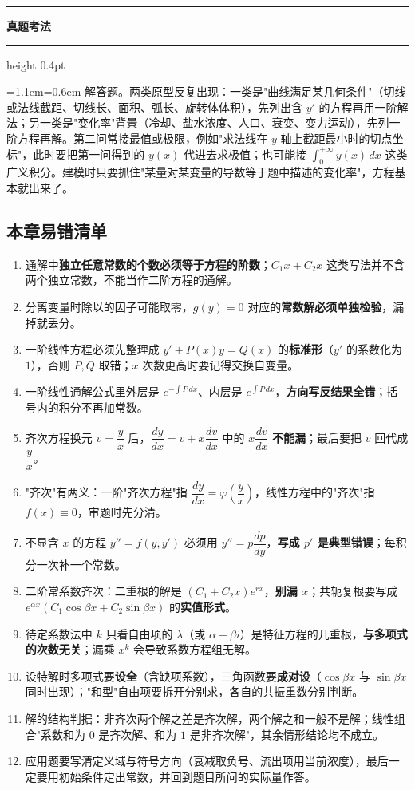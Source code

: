 \documentclass[11pt,openany,UTF8]{ctexbook}
\newcommand{\callouthead}[2]{%
  \par\addvspace{7pt}\noindent
  {\color{#1}\rule[-0.15em]{3pt}{1.05em}}\hspace{0.5em}%
  {\bfseries\color{#1}#2}\par\nobreak\vspace{-0.35em}%
  {\color{rulesep}\hrule height 0.4pt}\nobreak\vspace{0.45em}%
  \begingroup\small\setlength{\parindent}{0pt}%
  \leftskip=1.1em\rightskip=0.6em\noindent\ignorespaces}
\newcommand{\calloutend}{\par\endgroup\addvspace{7pt}}
\newenvironment{callexam}[1]{\callouthead{exambar}{#1}}{\calloutend}
\begin{document}
\begin{callexam}{真题考法}
解答题。两类原型反复出现：一类是"曲线满足某几何条件"（切线或法线截距、切线长、面积、弧长、旋转体体积），先列出含 $y'$ 的方程再用一阶解法；另一类是"变化率"背景（冷却、盐水浓度、人口、衰变、变力运动），先列一阶方程再解。第二问常接最值或极限，例如"求法线在 $y$ 轴上截距最小时的切点坐标"，此时要把第一问得到的 $y(x)$ 代进去求极值；也可能接 $\int_0^{+\infty}y(x)\,dx$ 这类广义积分。建模时只要抓住"某量对某变量的导数等于题中描述的变化率"，方程基本就出来了。

\end{callexam}

\subsection*{本章易错清单}

\begin{enumerate}
\item 通解中\textbf{独立任意常数的个数必须等于方程的阶数}；$C_1x+C_2x$ 这类写法并不含两个独立常数，不能当作二阶方程的通解。
\item 分离变量时除以的因子可能取零，$g(y)=0$ 对应的\textbf{常数解必须单独检验}，漏掉就丢分。
\item 一阶线性方程必须先整理成 $y'+P(x)y=Q(x)$ 的\textbf{标准形}（$y'$ 的系数化为 $1$），否则 $P,Q$ 取错；$x$ 次数更高时要记得交换自变量。
\item 一阶线性通解公式里外层是 $e^{-\int P\,dx}$、内层是 $e^{\int P\,dx}$，\textbf{方向写反结果全错}；括号内的积分不再加常数。
\item 齐次方程换元 $v=\dfrac yx$ 后，$\dfrac{dy}{dx}=v+x\dfrac{dv}{dx}$ 中的 $x\dfrac{dv}{dx}$ \textbf{不能漏}；最后要把 $v$ 回代成 $\dfrac yx$。
\item "齐次"有两义：一阶"齐次方程"指 $\dfrac{dy}{dx}=\varphi\!\left(\dfrac yx\right)$，线性方程中的"齐次"指 $f(x)\equiv 0$，审题时先分清。
\item 不显含 $x$ 的方程 $y''=f(y,y')$ 必须用 $y''=p\dfrac{dp}{dy}$，\textbf{写成 $p'$ 是典型错误}；每积分一次补一个常数。
\item 二阶常系数齐次：二重根的解是 $(C_1+C_2x)e^{rx}$，\textbf{别漏 $x$}；共轭复根要写成 $e^{\alpha x}(C_1\cos\beta x+C_2\sin\beta x)$ 的\textbf{实值形式}。
\item 待定系数法中 $k$ 只看自由项的 $\lambda$（或 $\alpha+\beta i$）是特征方程的几重根，\textbf{与多项式的次数无关}；漏乘 $x^{k}$ 会导致系数方程组无解。
\item 设特解时多项式要\textbf{设全}（含缺项系数），三角函数要\textbf{成对设}（$\cos\beta x$ 与 $\sin\beta x$ 同时出现）；"和型"自由项要拆开分别求，各自的共振重数分别判断。
\item 解的结构判据：非齐次两个解之差是齐次解，两个解之和一般不是解；线性组合"系数和为 $0$ 是齐次解、和为 $1$ 是非齐次解"，其余情形结论均不成立。
\item 应用题要写清定义域与符号方向（衰减取负号、流出项用当前浓度），最后一定要用初始条件定出常数，并回到题目所问的实际量作答。
\end{enumerate}
\end{document}
